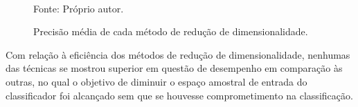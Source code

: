 \begin{figure}[!ht]
	\centering
	\\
	\caption{Precisão média de cada método de redução de dimensionalidade.}
	\label{fig:janelas}
	{\small Fonte: Próprio autor.} %
\end{figure}


Com relação à eficiência dos métodos de redução de dimensionalidade, nenhumas das técnicas se mostrou superior em questão de desempenho em comparação às outras, no qual o objetivo de diminuir o espaço amostral de entrada do classificador foi alcançado sem que se houvesse comprometimento na classificação.

